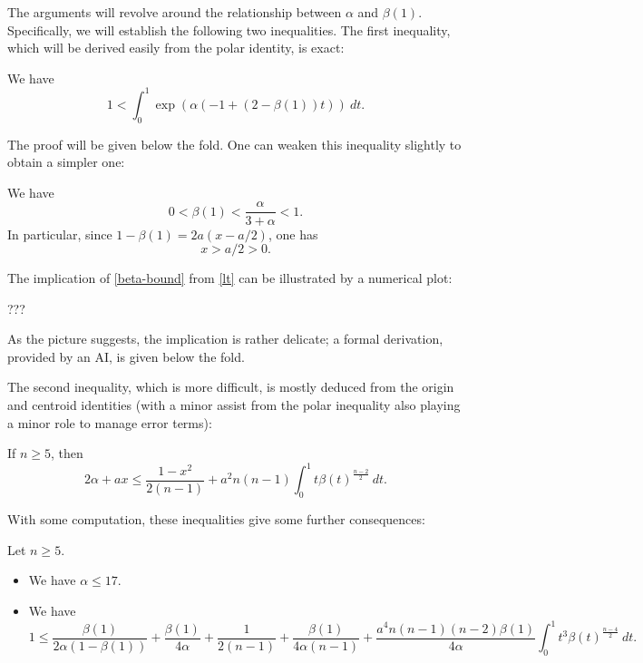 \documentclass[12pt]{article}
\begin{document}
The arguments will revolve around the relationship between $\alpha$ and $\beta(1)$.  Specifically, we will establish the following two inequalities.  The first inequality, which will be derived easily from the polar identity, is exact:

\begin{proposition}\label{polar}  We have 
\begin{equation}\label{lt} 
1 < \int_0^1 \exp ( \alpha (-1 + (2-\beta(1)) t))\ dt.
\end{equation}
\end{proposition}

The proof will be given below the fold.  One can weaken this inequality slightly to obtain a simpler one:

\begin{corollary}\label{polar-corollary}  We have
\begin{equation}\label{beta-bound}
    0 < \beta(1) < \frac{\alpha}{3+\alpha} < 1.
\end{equation}
In particular, since $1 - \beta(1) = 2a(x-a/2)$, one has
\begin{equation}\label{xa} 
    x > a/2 > 0.
\end{equation}
\end{corollary}

The implication of \eqref{beta-bound} from \eqref{lt} can be illustrated by a numerical plot:

???

As the picture suggests, the implication is rather delicate; a formal derivation, provided by an AI, is given below the fold.


The second inequality, which is more difficult, is mostly deduced from the origin and centroid identities (with a minor assist from the polar inequality also playing a minor role to manage error terms):

\begin{proposition}\label{origin} 
If $n \geq 5$, then
\begin{equation}\label{origin-exact}
 2 \alpha + ax \leq \frac{1-x^2}{2(n-1)} + a^2 n(n-1) \int_0^1 t \beta(t)^{\frac{n-2}{2}}\ dt.
\end{equation}
\end{proposition}

With some computation, these inequalities give some further consequences:

\begin{corollary}\label{origin-cor}  Let $n \geq 5$.
\begin{itemize}
    \item [(i)]  We have $\alpha \leq 17$.
    \item [(ii)]  We have
\begin{equation}\label{1le}
     1 \leq \frac{\beta(1)}{2\alpha(1-\beta(1))} + \frac{\beta(1)}{4\alpha} + \frac{1}{2(n-1)} + \frac{\beta(1)}{4\alpha(n-1)}  
+ \frac{a^4 n (n-1) (n-2) \beta(1)}{4\alpha} \int_0^1 t^3 \beta(t)^{\frac{n-4}{2}}\ dt.
\end{equation}
\end{itemize}
\end{corollary}
\end{document}
